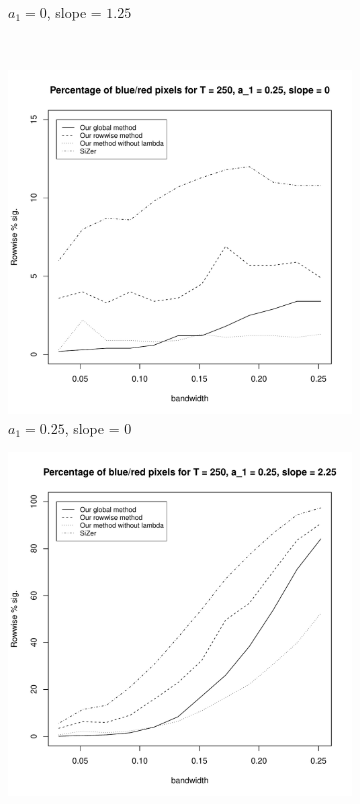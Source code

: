 \documentclass[a4paper,12pt]{article}
\begin{document}
\begin{figure}[t!]
\begin{subfigure}[b]{0.475\textwidth}
\caption{$a_1 = 0$, slope = $1.25$}
\end{subfigure}\\
\begin{subfigure}[b]{0.475\textwidth}
\includegraphics[width=\textwidth]{Plots/rowwise_sig_comparison_T_250_a1_25_slope_0.pdf}
\caption{$a_1 = 0.25$, slope = $0$}
\end{subfigure}\hspace{0.25cm}
\begin{subfigure}[b]{0.475\textwidth}
\includegraphics[width=\textwidth]{Plots/rowwise_sig_comparison_T_250_a1_25_slope_225.pdf}

\end{subfigure}
\end{figure}
\end{document}
